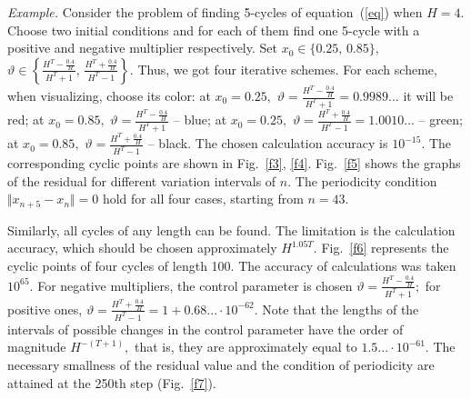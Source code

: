\documentclass[12pt,a4paper]{amsart}
\begin{document}
\textit{Example.} Consider the problem of finding 5-cycles of equation~(\ref{eq}) when $H=4.$ Choose two initial conditions and for each of them find one 
5-cycle with a positive and negative multiplier respectively. Set $x_0 \in \{0.25,\,0.85\},$ 
$\vartheta \in \left\{\frac{H^T - \frac{0.4}{H}}{H^T+1},\,\frac{H^T + \frac{0.4}{H}}{H^T-1} \right\}.$ Thus, we got four iterative 
schemes. For each scheme, when visualizing, choose its color: at $x_0=0.25,$ $\vartheta = \frac{H^T - \frac{0.4}{H}}{H^T+1}=0.9989...$ 
it will be red; at $x_0=0.85,$ $\vartheta = \frac{H^T - \frac{0.4}{H}}{H^T+1}$ -- blue; at $x_0=0.25,$
$\vartheta = \frac{H^T + \frac{0.4}{H}}{H^T-1}=1.0010...$ -- green; at $x_0=0.85,$ $\vartheta = \frac{H^T + \frac{0.4}{H}}{H^T-1}$ --
black. The chosen calculation accuracy is $10^{-15}.$ The corresponding cyclic points are shown in Fig.~\ref{f3}, \ref{f4}. Fig.~\ref{f5} shows 
the graphs of the residual for different variation intervals of $n.$ The periodicity condition $\Vert x_{n+5} - x_n\Vert=0$ hold for all four cases, 
starting from $n=43.$

Similarly, all cycles of any length can be found. The limitation is the calculation accuracy, which should be chosen approximately $H^{1.05 T}$.
Fig.~\ref{f6} represents the cyclic points of four cycles of length 100. The accuracy of calculations was taken $10^{65}.$ For negative multipliers, 
the control parameter is chosen $\vartheta = \frac{H^T - \frac{0.4}{H}}{H^T+1};$ for positive ones, 
$\vartheta = \frac{H^T + \frac{0.4}{H}}{H^T-1} = 1 + 0.68...\cdot10^{-62}.$ Note that the lengths of the intervals of possible changes 
in the control parameter have the order of magnitude $H^{-(T+1)},$ that is, they are approximately equal to $1.5...\cdot 10^{-61}.$ 
The necessary smallness of the residual value and the condition of periodicity are attained at the 250th step (Fig.~\ref{f7}).
\end{document}
